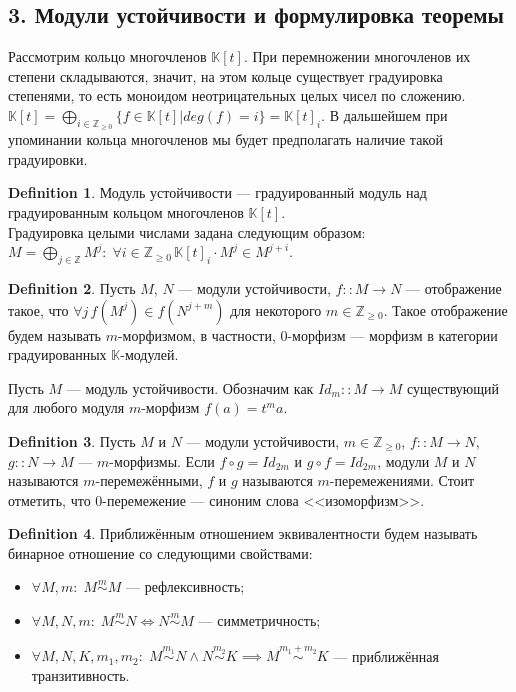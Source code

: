 \documentclass[a4paper, 12pt]{article}
\theoremstyle{definition}
\newtheorem{definition}{Definition}
\theoremstyle{remark}
\begin{document}
\subsection*{3. Модули устойчивости и формулировка теоремы}
Рассмотрим кольцо многочленов $\mathbb{K}[t]$. При перемножении многочленов их степени складываются, значит, на этом кольце существует градуировка степенями, то есть моноидом неотрицательных целых чисел по сложению. $\mathbb{K}[t] = \bigoplus_{i \in \mathbb{Z}_{\geq 0}} \{f \in \mathbb{K}[t] | deg(f) = i\} = \mathbb{K}[t]_i$. В дальшейшем при упоминании кольца многочленов мы будет предполагать наличие такой градуировки.\\
\begin{definition}
  Модуль устойчивости --- градуированный модуль над градуированным кольцом многочленов $\mathbb{K}[t]$.\\
  Градуировка целыми числами задана следующим образом: $M = \bigoplus_{j \in \mathbb{Z}} M^j:\; \forall i \in \mathbb{Z}_{\geq 0}\, \mathbb{K}[t]_i \cdot M^j \in M^{j+i}$.
\end{definition}
\begin{definition}
  Пусть $M$, $N$ --- модули устойчивости, $f :: M \to N$ --- отображение такое, что $\forall j\, f(M^j) \in f(N^{j+m})$ для некоторого $m \in \mathbb{Z}_{\geq 0}$. Такое отображение будем называть $m$-морфизмом, в частности, 0-морфизм --- морфизм в категории градуированных $\mathbb{K}$-модулей.
\end{definition}
Пусть $M$ --- модуль устойчивости. Обозначим как $Id_m :: M \to M$ существующий для любого модуля $m$-морфизм $f(a) = t^ma$.\\
\begin{definition}
  Пусть $M$ и $N$ --- модули устойчивости, $m \in \mathbb{Z}_{\geq 0}$, $f :: M \to N$, $g :: N \to M$ --- $m$-морфизмы. Если $f \circ g = Id_{2m}$ и $g \circ f = Id_{2m}$, модули $M$ и $N$ называются $m$-перемежёнными, $f$ и $g$ называются $m$-перемежениями. Стоит отметить, что $0$-перемежение --- синоним слова <<изоморфизм>>.
\end{definition}
\begin{definition}
  Приближённым отношением эквивалентности будем называть бинарное отношение со следующими свойствами:
  \begin{itemize}
    \item $\forall M,m:\; M \stackrel{m}{\sim} M$ --- рефлексивность;\\
    \item $\forall M,N,m:\; M \stackrel{m}{\sim} N \iff N \stackrel{m}{\sim} M$ --- симметричность;\\
    \item $\forall M,N,K,m_1,m_2:\; M \stackrel{m_1}{\sim} N \land N \stackrel{m_2}{\sim} K \implies M \stackrel{m_1 + m_2}{\sim} K$ --- приближённая транзитивность.\\
  \end{itemize}
\end{definition}
\end{document}
